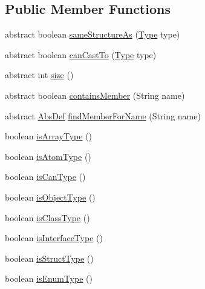\subsection*{Public Member Functions}
\begin{DoxyCompactItemize}
\item 
abstract boolean \hyperlink{classcompiler_1_1seman_1_1type_1_1_type_a80ff5c751157b91a4ef7a72d072608e5}{same\+Structure\+As} (\hyperlink{classcompiler_1_1seman_1_1type_1_1_type}{Type} type)
\item 
abstract boolean \hyperlink{classcompiler_1_1seman_1_1type_1_1_type_aa8b9322fe9d70709a6889182d4915dc0}{can\+Cast\+To} (\hyperlink{classcompiler_1_1seman_1_1type_1_1_type}{Type} type)
\item 
abstract int \hyperlink{classcompiler_1_1seman_1_1type_1_1_type_a9068b6449da6f7d0423a9d0f063d73f1}{size} ()
\item 
abstract boolean \hyperlink{classcompiler_1_1seman_1_1type_1_1_type_a34730755860770c38f6d378f393c21ad}{contains\+Member} (String name)
\item 
abstract \hyperlink{classcompiler_1_1abstr_1_1tree_1_1def_1_1_abs_def}{Abs\+Def} \hyperlink{classcompiler_1_1seman_1_1type_1_1_type_a5b4efe8679a43a9f8a2f2e8aa5fd9c02}{find\+Member\+For\+Name} (String name)
\item 
boolean \hyperlink{classcompiler_1_1seman_1_1type_1_1_type_a622dc69f5d84cd71502cfc9102c469ec}{is\+Array\+Type} ()
\item 
boolean \hyperlink{classcompiler_1_1seman_1_1type_1_1_type_a16311764e174d709cb701833a12ca822}{is\+Atom\+Type} ()
\item 
boolean \hyperlink{classcompiler_1_1seman_1_1type_1_1_type_a7cb5e946db382ef23bc2e6c36c8f78b2}{is\+Can\+Type} ()
\item 
boolean \hyperlink{classcompiler_1_1seman_1_1type_1_1_type_a2d595b0bcd8e172fc13a23f9e76900aa}{is\+Object\+Type} ()
\item 
boolean \hyperlink{classcompiler_1_1seman_1_1type_1_1_type_a3835ea547dbb5a3bb1b66b85067c4787}{is\+Class\+Type} ()
\item 
boolean \hyperlink{classcompiler_1_1seman_1_1type_1_1_type_abba77bd23e381b581f77fd85c7fcbe74}{is\+Interface\+Type} ()
\item 
boolean \hyperlink{classcompiler_1_1seman_1_1type_1_1_type_a77accd095ff3348d4adc158279495bd1}{is\+Struct\+Type} ()
\item 
boolean \hyperlink{classcompiler_1_1seman_1_1type_1_1_type_aa5a878a0a9b99bd5894d4fee19a35d3b}{is\+Enum\+Type} ()

\end{DoxyCompactItemize}
